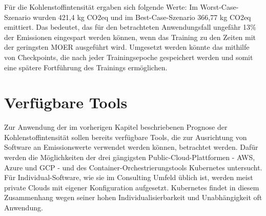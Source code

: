 Für die Kohlenstoffintensität ergaben sich folgende Werte:
Im Worst-Case-Szenario wurden 421,4 kg \ac{CO2}eq und im Best-Case-Szenario 366,77 kg \ac{CO2}eq emittiert.
Das bedeutet, das für den betrachteten Anwendungsfall ungefähr 13\% der Emissionen eingespart werden können, wenn das Training zu den Zeiten mit der geringsten \ac{MOER} ausgeführt wird.
Umgesetzt werden könnte das mithilfe von Checkpoints, die nach jeder Trainingsepoche gespeichert werden und somit eine spätere Fortführung des Trainings ermöglichen.


%

\section{Verfügbare Tools}\label{CAP:tools}
Zur Anwendung der im vorherigen Kapitel beschriebenen Prognose der Kohlenstoffintensität sollen bereits verfügbare Tools, die zur Ausrichtung von Software an Emissionswerte verwendet werden können, betrachtet werden.
Dafür werden die Möglichkeiten der drei gängigsten Public-Cloud-Plattformen - \ac{AWS}, Azure und \ac{GCP} - und des Container-Orchestrierungstools Kubernetes untersucht.
Für Individual-Software, wie sie im Consulting Umfeld üblich ist, werden meist private Clouds mit eigener Konfiguration aufgesetzt.
Kubernetes findet in diesem Zusammenhang wegen seiner hohen Individualisierbarkeit und Unabhängigkeit oft Anwendung.
% 

